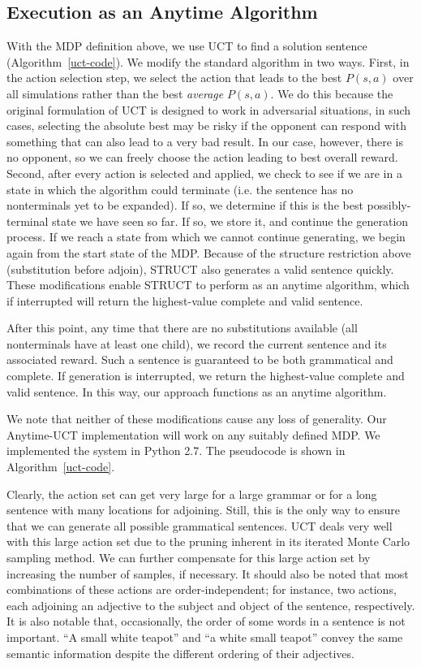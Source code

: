 \subsection{Execution as an Anytime Algorithm}
 With the MDP definition above, we use UCT to find a solution sentence
 (Algorithm~\ref{uct-code}). We modify the standard algorithm in two
 ways. First, in the action selection step, we select the action that
 leads to the best $P(s,a)$ over all simulations rather than the best
 {\em average} $P(s,a)$. We do this because the original formulation
 of UCT is designed to work in adversarial situations, in such cases,
 selecting the absolute best may be risky if the opponent can respond
 with something that can also lead to a very bad result. In our case,
 however, there is no opponent, so we can freely choose the action
 leading to best overall reward. Second, after every action is
 selected and applied, we check to see if we are in a state in which
 the algorithm could terminate (i.e. the sentence has no nonterminals
 yet to be expanded).  If so, we determine if this is the best
 possibly-terminal state we have seen so far.  If so, we store it, and
 continue the generation process. If we reach a state from which we
 cannot continue generating, we begin again from the start state of
 the MDP. Because of the structure restriction above (substitution
 before adjoin), STRUCT also generates a valid sentence quickly. These
 modifications enable STRUCT to perform as an anytime algorithm, which
 if interrupted will return the highest-value complete and valid
 sentence.

After this point, any time that there are no substitutions
available (all nonterminals have at least one child), we record the
current sentence and its associated reward.  Such a sentence is
guaranteed to be both grammatical and complete.  If generation is
interrupted, we return the highest-value complete and valid sentence.
In this way, our approach functions as an anytime algorithm.

 We note that neither of these modifications cause any loss of
 generality.  Our Anytime-UCT implementation will work on any suitably
 defined MDP.  We implemented the system in Python 2.7. The pseudocode
  is shown in Algorithm~\ref{uct-code}.

 Clearly, the action set can get very large for a large grammar or for
 a long sentence with many locations for adjoining.  Still, this is the
 only way to ensure that we can generate all possible grammatical
 sentences.  UCT deals very well with this large action set due to the
 pruning inherent in its iterated Monte Carlo sampling method.  We can
 further compensate for this large action set by increasing the number
 of samples, if necessary.  It should also be noted that most
 combinations of these actions are order-independent; for instance, two
 actions, each adjoining an adjective to the subject and object of the
 sentence, respectively.  It is also notable that, occasionally, the
 order of some words in a sentence is not important.  ``A small white
 teapot'' and ``a white small teapot'' convey the same semantic
 information despite the different ordering of their adjectives.


